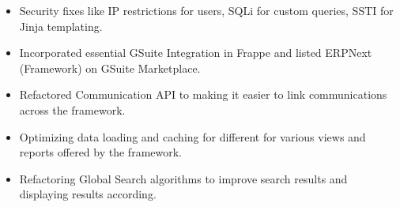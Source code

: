 \begin{cventries}
{\begin{cvitems}
            \begin{itemize}
                \item {Security fixes like IP restrictions for users, SQLi for custom queries, SSTI for Jinja templating.}
                \item {Incorporated essential GSuite Integration in Frappe and listed ERPNext (Framework) on GSuite Marketplace.}
                \item {Refactored Communication API to making it easier to link communications across the framework.}
                \item {Optimizing data loading and caching for different for various views and reports offered by the framework.}
                \item {Refactoring Global Search algorithms to improve search results and displaying results according.}
            \end{itemize}
      \end{cvitems}
    }
\end{cventries}